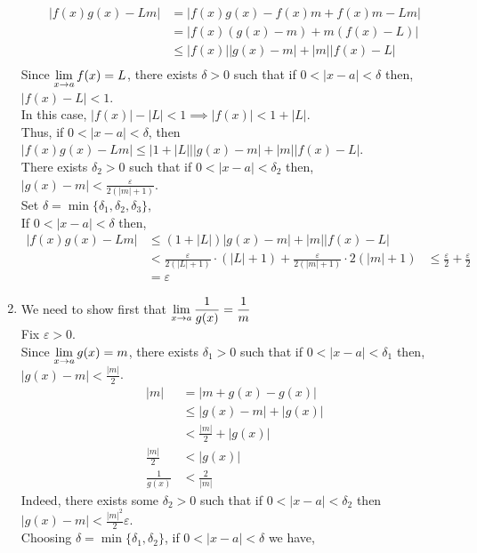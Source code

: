 \documentclass[12pt]{article}
\begin{document}
\begin{prf}{}
\begin{enumerate}
\begin{align*}
        |f(x)g(x) - Lm| &= |f(x)g(x) - f(x)m + f(x)m - Lm|\\
        &= |f(x)(g(x) - m) + m(f(x) - L)|\\
        &\le |f(x)||g(x) - m| + |m||f(x) - L|\\
    \end{align*}
    Since \(\displaystyle\lim_{x\to a}f(x) = L\), there exists \(\delta > 0\) such that if \(0 < |x - a| < \delta\) then, \(|f(x) - L| < 1\).\\
    In this case, \(|f(x)| - |L| < 1 \implies |f(x)| < 1 + |L|\).\\
    Thus, if \(0 < |x - a| < \delta\), then \(|f(x)g(x) - Lm| \le |1 + |L|||g(x) - m| + |m||f(x) - L|\).\\
    There exists \(\delta_2 > 0\) such that if \(0 < |x-a| < \delta_2\) then, \(|g(x) - m| < \frac{\varepsilon}{2(|m| + 1)}\).\\
    Set \(\delta = \min\{\delta_1, \delta_2, \delta_3\}\),\\
    If \(0 < |x-a| < \delta\) then,
    \begin{align*}
        |f(x)g(x) - Lm| &\le (1+|L|)|g(x) - m| + |m||f(x) - L|\\
        &< \frac{\varepsilon}{2(|L| + 1)}\cdot(|L| + 1) + \frac{\varepsilon}{2(|m| + 1)} \cdot 2(|m| + 1)
        &\le \frac{\varepsilon}{2} + \frac{\varepsilon}{2}\\
        &= \varepsilon 
    \end{align*}
    \item We need to show first that \(\displaystyle\lim_{x\to a}\frac{1}{g(x)} = \frac{1}{m}\)\\
    Fix \(\varepsilon > 0\). \\
    Since \(\displaystyle\lim_{x\to a}g(x) = m\), there exists \(\delta_1 > 0\) such that if \(0 < |x - a| < \delta_1\) then, \(|g(x) - m| < \frac{|m|}{2}\).\\
    \begin{align*}
        |m| &= |m + g(x) - g(x)|\\
        &\le |g(x) - m| + |g(x)|\\
        &< \frac{|m|}{2} + |g(x)|\\
        \frac{|m|}{2} &< |g(x)|\\
        \frac{1}{g(x)} &< \frac{2}{|m|}
    \end{align*}
    Indeed, there exists some \(\delta_2 > 0\) such that if \(0 < |x - a| < \delta_2\) then \(|g(x) - m| < \frac{|m|^2}{2}\varepsilon\).\\
    Choosing \(\delta = \min\{\delta_1, \delta_2\}\), if \(0 < |x - a| < \delta\) we have,\\

\end{enumerate}
\end{prf}
\end{document}
